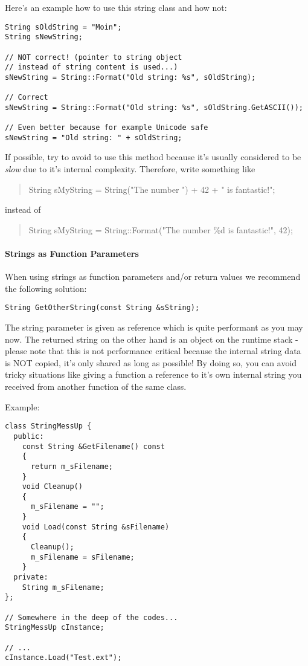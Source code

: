 Here's an example how to use this string class and how not:

\begin{lstlisting}[caption=Valid and invalid string usage example]
String sOldString = "Moin";
String sNewString;

// NOT correct! (pointer to string object
// instead of string content is used...)
sNewString = String::Format("Old string: %s", sOldString);

// Correct
sNewString = String::Format("Old string: %s", sOldString.GetASCII());

// Even better because for example Unicode safe
sNewString = "Old string: " + sOldString;
\end{lstlisting}

If possible, try to avoid to use this method because it's usually considered to be \emph{slow} due to it's internal complexity. Therefore, write something like
\begin{quote}String sMyString = String("The number ") + 42 + " is fantastic!";\end{quote} instead of \begin{quote}String sMyString = String::Format("The number \%d is fantastic!", 42);\end{quote}


\paragraph{Strings as Function Parameters}
When using strings as function parameters and/or return values we recommend the following solution:

\begin{lstlisting}[caption=String as function parameter and return value]
String GetOtherString(const String &sString);
\end{lstlisting}

The string parameter is given as reference which is quite performant as you may now. The returned string on the other hand is an object on the runtime stack - please note that this is not performance critical because the internal string data is NOT copied, it's only shared as long as possible! By doing so, you can avoid tricky situations like giving a function a reference to it's own internal string you received from another function of the same class.

Example:

\begin{lstlisting}[caption=Error prone string usage example]
class StringMessUp {
  public:
    const String &GetFilename() const
    {
      return m_sFilename;
    }
    void Cleanup()
    {
      m_sFilename = "";
    }
    void Load(const String &sFilename)
    {
      Cleanup();
      m_sFilename = sFilename;
    }
  private:
    String m_sFilename;
};

// Somewhere in the deep of the codes...
StringMessUp cInstance;

// ...
cInstance.Load("Test.ext");
\end{lstlisting}

